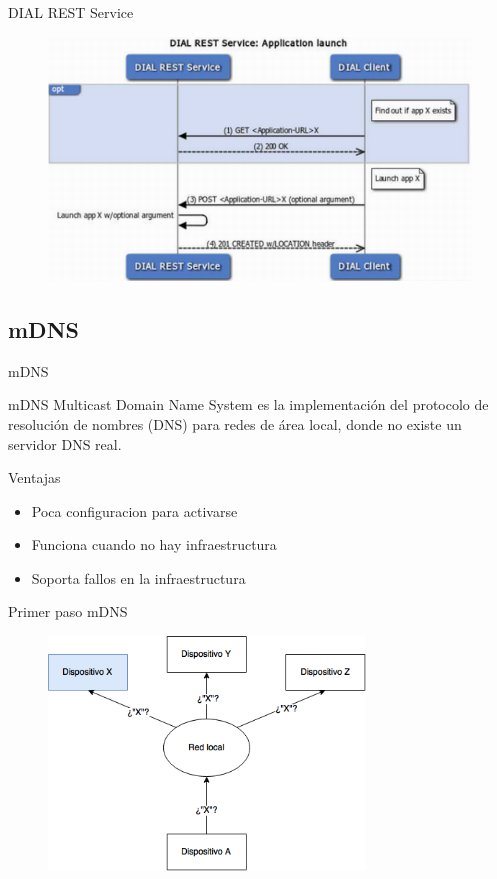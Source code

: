 \begin{frame}{DIAL REST Service}
	\begin{figure}[H]
		\centering
		\includegraphics[width=1\textwidth]{./Imagenes/dialrest.png}
	\end{figure}
\end{frame}

\subsection{mDNS}

\begin{frame}{mDNS}
	\begin{block}{mDNS}
		Multicast Domain Name System es la implementación del protocolo de resolución de nombres (DNS) para redes de área local, donde no existe un servidor DNS real.		
	\end{block}
	
	\begin{block}{Ventajas}
		\begin{itemize}
			\item Poca configuracion para activarse
			\item Funciona cuando no hay infraestructura
			\item Soporta fallos en la infraestructura
		\end{itemize}
	\end{block}
\end{frame}


\begin{frame}{Primer paso mDNS}
	\begin{figure}[H]
		\centering
		\includegraphics[width=0.75\textwidth]{./Imagenes/mdns1.png}
		\label{fig:mdns1}
	\end{figure}
\end{frame}


